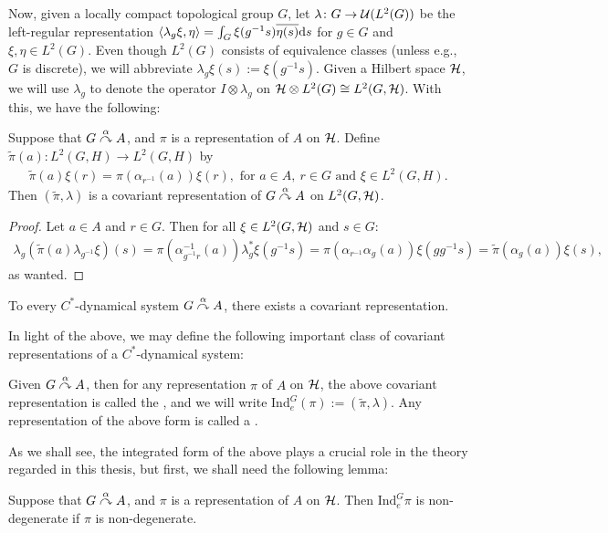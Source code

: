 Now, given a locally compact topological group $G$, let $\lambda \colon G \to \mathcal{U}(L^2(G))$ be the left-regular representation $\langle \lambda_g \xi, \eta\rangle = \int_G \xi(g^{-1}s)\overline{\eta(s)}\mathrm{d} s$ for $g \in G$ and $\xi, \eta \in L^2(G)$. Even though $L^2(G)$ consists of equivalence classes (unless e.g., $G$ is discrete), we will abbreviate $\lambda_g \xi(s) := \xi(g^{-1}s)$. Given a Hilbert space $\mathcal{H}$, we will use $\lambda_g$ to denote the operator $I \otimes \lambda_g$ on $\mathcal{H} \otimes L^2(G) \cong L^2(G,\mathcal{H})$. With this, we have the following:
\begin{lemma}
Suppose that $G \stackrel{\alpha}{\curvearrowright} A$, and $\pi$ is a representation of $A$ on $\mathcal{H}$. Define $\tilde{\pi}(a) \colon L^2(G,H) \to L^2(G,H)$ by 
\begin{align*}
	\tilde{\pi}(a)\xi(r) = \pi(\alpha_{r^{-1}}(a))\xi(r), \text{ for } a \in A, \ r \in G \text{ and } \xi \in L^2(G,H).
\end{align*}
Then $(\tilde{\pi},\lambda)$ is a covariant representation of $G \stackrel{\alpha}{\curvearrowright} A$ on $L^2(G,\mathcal{H})$.
\label{cross:regularrep}
\end{lemma}
\begin{proof}
Let $a \in A$ and $r \in G$. Then for all $\xi \in L^2(G,\mathcal{H})$ and $s \in G$:
\begin{align*}
	\lambda_g (\tilde{\pi}(a) \lambda_{g^{-1}} \xi)(s) = \pi(\alpha_{g^{-1}r}^{-1}(a))\lambda_g^* \xi(g^{-1}s) = \pi(\alpha_{r^{-1}}\alpha_g(a))\xi (g g^{-1} s) = \tilde{\pi}(\alpha_g(a))\xi(s),
\end{align*}
as wanted.
\end{proof}
\begin{corollary}
To every $C^*$-dynamical system $G \stackrel{\alpha}{\curvearrowright} A$, there exists a covariant representation.
\end{corollary}
In light of the above, we may define the following important class of covariant representations of a $C^*$-dynamical system:
\begin{definition}
Given $G \stackrel{\alpha}{\curvearrowright} A$, then for any representation $\pi$ of $A$ on $\mathcal{H}$, the above covariant representation is called the , and we will write $\mathrm{Ind}_e^G(\pi) := (\tilde{\pi}, \lambda)$. Any representation of the above form is called a .
\end{definition}
As we shall see, the integrated form of the above plays a crucial role in the theory regarded in this thesis, but first, we shall need the following lemma:
\begin{lemma}
Suppose that $G \stackrel{\alpha}{\curvearrowright} A$, and $\pi$ is a representation of $A$ on $\mathcal{H}$. Then $\mathrm{Ind}_e^G \pi$ is non-degenerate if $\pi$ is non-degenerate.
\label{cross:regrepnondeg}
\end{lemma}
